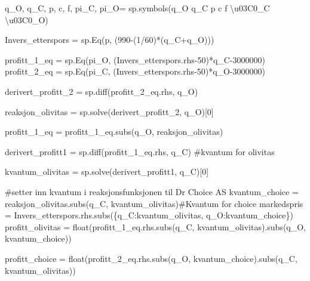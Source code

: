 \documentclass[
  12pt,
  a4paper,
  DIV=11,
  numbers=noendperiod]{scrartcl}
\newenvironment{Shaded}{\begin{snugshade}}{\end{snugshade}}
\newcommand{\BuiltInTok}[1]{\textcolor[rgb]{0.00,0.23,0.31}{#1}}
\newcommand{\CharTok}[1]{\textcolor[rgb]{0.13,0.47,0.30}{#1}}
\newcommand{\CommentTok}[1]{\textcolor[rgb]{0.37,0.37,0.37}{#1}}
\newcommand{\DecValTok}[1]{\textcolor[rgb]{0.68,0.00,0.00}{#1}}
\newcommand{\NormalTok}[1]{\textcolor[rgb]{0.00,0.23,0.31}{#1}}
\newcommand{\OperatorTok}[1]{\textcolor[rgb]{0.37,0.37,0.37}{#1}}
\newcommand{\StringTok}[1]{\textcolor[rgb]{0.13,0.47,0.30}{#1}}
\begin{document}
\begin{Shaded}
\begin{Highlighting}[]
\NormalTok{q\_O, q\_C, p, c, f, pi\_C, pi\_O}\OperatorTok{=}\NormalTok{ sp.symbols(}\StringTok{\textquotesingle{}q\_O q\_C p c f }\CharTok{\textbackslash{}u03C0}\StringTok{\_C }\CharTok{\textbackslash{}u03C0}\StringTok{\_O\textquotesingle{}}\NormalTok{)}

\NormalTok{Invers\_etterspors }\OperatorTok{=}\NormalTok{ sp.Eq(p, (}\DecValTok{990}\OperatorTok{{-}}\NormalTok{(}\DecValTok{1}\OperatorTok{/}\DecValTok{60}\NormalTok{)}\OperatorTok{*}\NormalTok{(q\_C}\OperatorTok{+}\NormalTok{q\_O)))}


\NormalTok{profitt\_1\_eq }\OperatorTok{=}\NormalTok{ sp.Eq(pi\_O, (Invers\_etterspors.rhs}\OperatorTok{{-}}\DecValTok{50}\NormalTok{)}\OperatorTok{*}\NormalTok{q\_C}\OperatorTok{{-}}\DecValTok{3000000}\NormalTok{)}
\NormalTok{profitt\_2\_eq }\OperatorTok{=}\NormalTok{ sp.Eq(pi\_C, (Invers\_etterspors.rhs}\OperatorTok{{-}}\DecValTok{50}\NormalTok{)}\OperatorTok{*}\NormalTok{q\_O}\OperatorTok{{-}}\DecValTok{3000000}\NormalTok{)}


\NormalTok{derivert\_profitt\_2 }\OperatorTok{=}\NormalTok{ sp.diff(profitt\_2\_eq.rhs, q\_O)}

\NormalTok{reaksjon\_olivitas }\OperatorTok{=}\NormalTok{ sp.solve(derivert\_profitt\_2, q\_O)[}\DecValTok{0}\NormalTok{]}

\NormalTok{profitt\_1\_eq }\OperatorTok{=}\NormalTok{ profitt\_1\_eq.subs(q\_O, reaksjon\_olivitas)}

\NormalTok{derivert\_profitt1 }\OperatorTok{=}\NormalTok{ sp.diff(profitt\_1\_eq.rhs, q\_C) }\CommentTok{\#kvantum for olivitas}

\NormalTok{kvantum\_olivitas }\OperatorTok{=}\NormalTok{ sp.solve(derivert\_profitt1, q\_C)[}\DecValTok{0}\NormalTok{]}

\CommentTok{\#setter inn kvantum i reaksjonsfunksjonen til Dr Choice AS}
\NormalTok{kvantum\_choice }\OperatorTok{=}\NormalTok{ reaksjon\_olivitas.subs(q\_C, kvantum\_olivitas)}\CommentTok{\#Kvantum for choice}
\NormalTok{markedspris }\OperatorTok{=}\NormalTok{ Invers\_etterspors.rhs.subs(\{q\_C:kvantum\_olivitas, q\_O:kvantum\_choice\})}
\NormalTok{profitt\_olivitas }\OperatorTok{=} \BuiltInTok{float}\NormalTok{(profitt\_1\_eq.rhs.subs(q\_C, kvantum\_olivitas).subs(q\_O, kvantum\_choice))}

\NormalTok{profitt\_choice }\OperatorTok{=} \BuiltInTok{float}\NormalTok{(profitt\_2\_eq.rhs.subs(q\_O, kvantum\_choice).subs(q\_C, kvantum\_olivitas))}
\end{Highlighting}
\end{Shaded}
\end{document}
